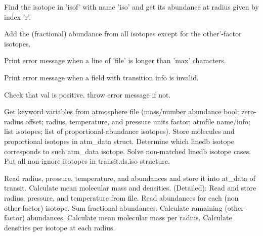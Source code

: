 \documentclass[letterpaper,12pt]{article}
\begin{document}
Find the isotope in 'isof'  with name 'iso' and get its abundance at
radius given by index 'r'. \newline

Add the (fractional) abundance from all isotopes except for the
other'-factor isotopes. \newline

Print error message when a line of 'file' is longer than 'max' characters. \newline

Print error message when a field with transition info is invalid. \newline

Check that val is positive. throw error message if not. \newline

Get keyword variables from atmosphere file (mass/number abundance bool;
zero-radius offset; radius, temperature, and pressure units factor;
atmfile name/info; list isotopes; list of proportional-abundance isotopes).
Store molecules and proportional isotopes in atm\_data struct. 
Determine which linedb isotope corresponds to such atm\_data isotope.
Solve non-matched linedb isotope cases.
Put all non-ignore isotopes in transit.ds.iso structure. \newline

Read radius, pressure, temperature, and abundances and store it into
at\_data of transit.  Calculate mean molecular mass and densities.
(Detailed): Read and store radius, pressure, and temperature from
file.  Read abundances for each (non other-factor) isotope.  Sum
fractional abundances. Calculate ramaining (other-factor) abundances.
Calculate mean molecular mass per radius.  Calculate densities per
isotope at each radius. \newline
\end{document}
